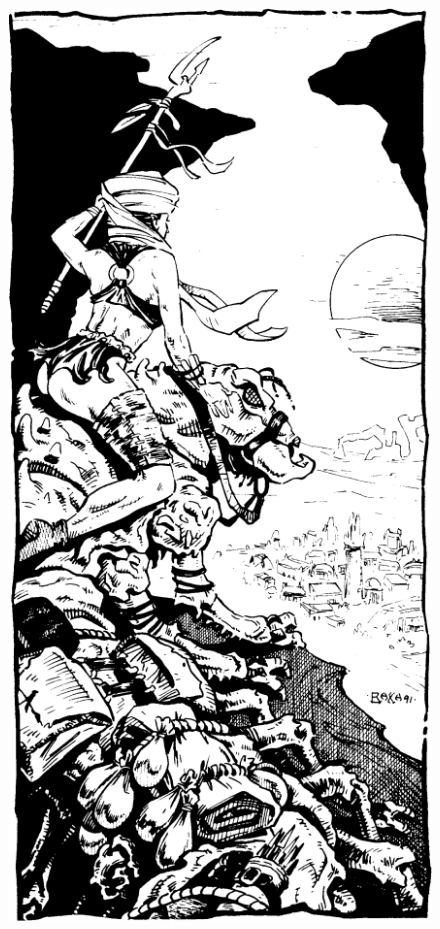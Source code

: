\begin{figure}[t!]
\centering
\includegraphics[width=\columnwidth]{images/ranger-1.png}
\WOTC
\end{figure}

